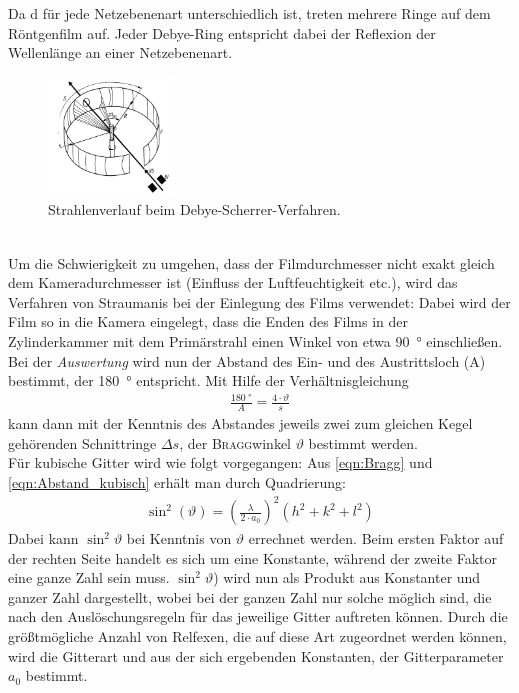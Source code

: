 \documentclass[a4paper,twoside,final]{article}
\begin{document}
Da d für jede Netzebenenart unterschiedlich ist, treten mehrere Ringe auf dem Röntgenfilm auf. Jeder Debye-Ring entspricht dabei der Reflexion der Wellenlänge an einer Netzebenenart.
\begin{figure}[htp]
    \centering
    \includegraphics[width=0.3\textwidth]{Abbildungen/Debye-Sherrer-Kamera.pdf}
    \caption{Strahlenverlauf beim Debye-Scherrer-Verfahren.~\cite[S.375]{Kleber}}
    \label{fig:Debye-Kamera}
\end{figure}\\
Um die Schwierigkeit zu umgehen, dass der Filmdurchmesser nicht exakt gleich dem Kameradurchmesser ist (Einfluss der Luftfeuchtigkeit etc.), wird das Verfahren von Straumanis bei der Einlegung des Films verwendet: Dabei wird der Film so in die Kamera eingelegt, dass die Enden des Films in der Zylinderkammer mit dem Primärstrahl einen Winkel von etwa \SI{90}{\degree} einschließen.\\
Bei der \textit{Auswertung} wird nun der Abstand des Ein- und des Austrittsloch (A) bestimmt, der \SI{180}{\degree} entspricht. Mit Hilfe der Verhältnisgleichung
\begin{align}
  \frac{\SI{180}{\degree}}{A} = \frac{4\cdot \vartheta}{ s}\label{eqn:Verhältnisgleichung}
\end{align}
kann dann mit der Kenntnis des Abstandes jeweils zwei zum gleichen Kegel gehörenden Schnittringe $\Delta s$, der \textsc{Bragg}winkel $\vartheta$ bestimmt werden. \\
Für kubische Gitter wird wie folgt vorgegangen: Aus \eqref{eqn:Bragg} und \eqref{eqn:Abstand_kubisch} erhält man durch Quadrierung:
\begin{align}
  \sin^2(\vartheta) = \left(\frac{\lambda}{2\cdot a_0}\right)^2 (h^2+k^2+l^2)
\end{align}
Dabei kann $\sin^2\vartheta$ bei Kenntnis von $\vartheta$ errechnet werden. Beim ersten Faktor auf der rechten Seite handelt es sich um eine Konstante, während der zweite Faktor eine ganze Zahl sein muss. $\sin^2\vartheta$) wird nun als Produkt aus Konstanter und ganzer Zahl dargestellt, wobei bei der ganzen Zahl nur solche möglich sind, die nach den Auslöschungsregeln für das jeweilige Gitter auftreten können. Durch die größtmögliche Anzahl von Relfexen, die auf diese Art zugeordnet werden können, wird die Gitterart und aus der sich ergebenden Konstanten, der Gitterparameter $a_0$ bestimmt.
\end{document}
